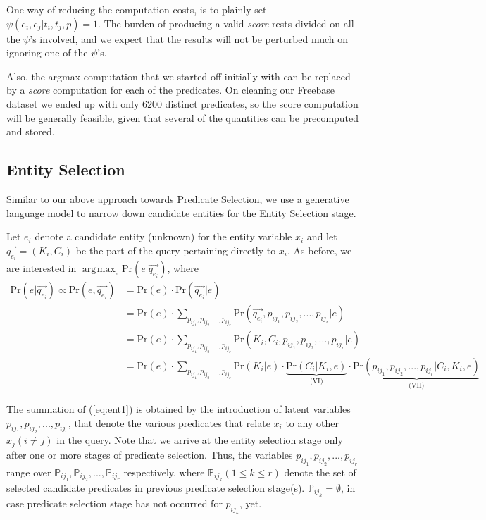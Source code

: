 \documentclass[a4paper, twoside, 12pt]{report}
\DeclareMathOperator*{\argmax}{arg\!\max}
\begin{document}
One way of reducing the computation costs, is to plainly set $\psi(e_i, e_j | t_i, t_j, p) = 1$. The burden of producing a valid \emph{score} rests divided on all the $\psi$'s involved, and we expect that the results will not be perturbed much on ignoring one of the $\psi$'s.

Also, the argmax computation that we started off initially with can be replaced by a \emph{score} computation for each of the predicates. On cleaning our Freebase dataset we ended up with only 6200 distinct predicates, so the score computation will be generally feasible, given that several of the quantities can be precomputed and stored.

\subsection{Entity Selection}
Similar to our above approach towards Predicate Selection, we use a generative language model to narrow down candidate entities for the Entity Selection stage.

Let $e_i$ denote a candidate entity (unknown) for the entity variable $x_i$ and let $\vec{q_{e_i}} = (K_i, C_i)$ be the part of the query pertaining directly to $x_i$. As before, we are interested in $\argmax_{e} \text{Pr}(e|\vec{q_{e_i}})$, where
\begin{align}
\text{Pr}(e|\vec{q_{e_i}}) \propto \text{Pr}(e, \vec{q_{e_i}}) & = \text{Pr}(e) \cdot \text{Pr}(\vec{q_{e_i}}|e)  \\
\label{eq:ent1}  &= \text{Pr}(e) \cdot \sum_{p_{ij_1}, p_{ij_2},..., p_{ij_r}}\text{Pr}(\vec{q_{e_i}}, p_{ij_1}, p_{ij_2},..., p_{ij_r} | e) \\
 &= \text{Pr}(e) \cdot \sum_{p_{ij_1}, p_{ij_2},..., p_{ij_r}}\text{Pr}(K_i, C_i, p_{ij_1}, p_{ij_2},..., p_{ij_r} | e)  \nonumber \\
  &= \text{Pr}(e) \cdot \sum_{p_{ij_1}, p_{ij_2},..., p_{ij_r}} \text{Pr}(K_i | e) \cdot \underbrace{\text{Pr}(C_i | K_i, e)}_\text{(VI)} \cdot \underbrace{\text{Pr}(p_{ij_1}, p_{ij_2},..., p_{ij_r} | C_i, K_i, e)}_\text{(VII)} \label{eq:entmain2}
\end{align}

The summation of (\ref{eq:ent1}) is obtained by the introduction of latent variables $p_{ij_1}, p_{ij_2},..., p_{ij_r}$, that denote the various predicates that relate $x_i$ to any other $x_j (i \neq j)$ in the query. Note that we arrive at the entity selection stage only after one or more stages of predicate selection. Thus, the variables $p_{ij_1}, p_{ij_2},..., p_{ij_r}$ range over $\mathbb{P}_{ij_1}, \mathbb{P}_{ij_2}, ...,\mathbb{P}_{ij_r}$ respectively, where $\mathbb{P}_{ij_k} (1 \le k \le r)$ denote the set of selected candidate predicates in previous predicate selection stage(s). $\mathbb{P}_{ij_k} = \emptyset$, in case predicate selection stage has not occurred for $p_{ij_k}$, yet.
\end{document}
